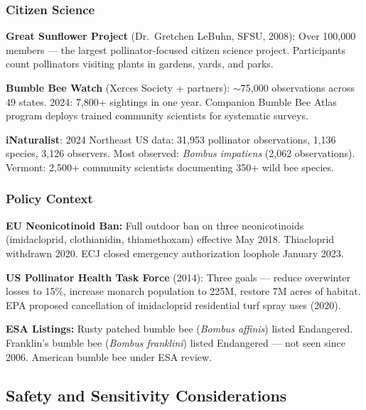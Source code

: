 \documentclass[11pt,letterpaper]{article}
\begin{document}
\subsubsection{Citizen Science}

\textbf{Great Sunflower Project} (Dr.\ Gretchen LeBuhn, SFSU, 2008): Over 100,000 members --- the largest pollinator-focused citizen science project. Participants count pollinators visiting plants in gardens, yards, and parks.

\textbf{Bumble Bee Watch} (Xerces Society + partners): $\sim$75,000 observations across 49 states. 2024: 7,800+ sightings in one year. Companion Bumble Bee Atlas program deploys trained community scientists for systematic surveys.

\textbf{iNaturalist}: 2024 Northeast US data: 31,953 pollinator observations, 1,136 species, 3,126 observers. Most observed: \textit{Bombus impatiens} (2,062 observations). Vermont: 2,500+ community scientists documenting 350+ wild bee species.

\subsubsection{Policy Context}

\textbf{EU Neonicotinoid Ban:} Full outdoor ban on three neonicotinoids (imidacloprid, clothianidin, thiamethoxam) effective May 2018. Thiacloprid withdrawn 2020. ECJ closed emergency authorization loophole January 2023.

\textbf{US Pollinator Health Task Force} (2014): Three goals --- reduce overwinter losses to 15\%, increase monarch population to 225M, restore 7M acres of habitat. EPA proposed cancellation of imidacloprid residential turf spray uses (2020).

\textbf{ESA Listings:} Rusty patched bumble bee (\textit{Bombus affinis}) listed Endangered. Franklin's bumble bee (\textit{Bombus franklini}) listed Endangered --- not seen since 2006. American bumble bee under ESA review.

\subsection{Safety and Sensitivity Considerations}
\end{document}
